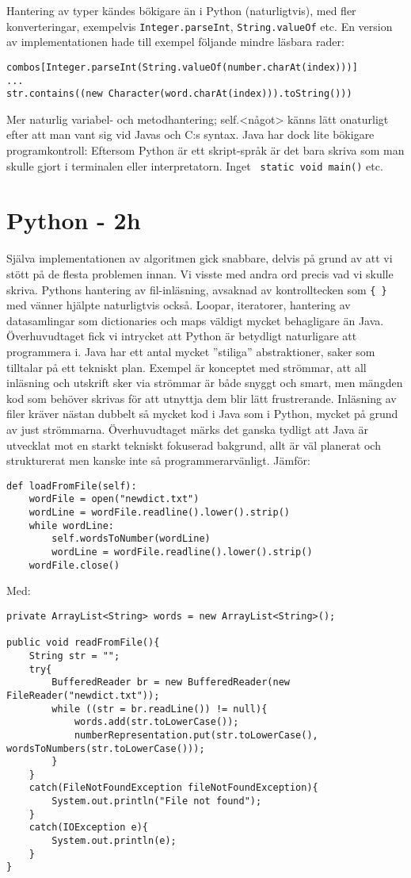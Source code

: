 \documentclass[a4paper, twoside, 11pt]{article}
\begin{document}
Hantering av typer kändes bökigare än i Python (naturligtvis), med fler konverteringar, exempelvis \verb|Integer.parseInt|, \verb|String.valueOf| etc. En version av implementationen hade till exempel följande mindre läsbara rader:\\
\begin{verbatim}
combos[Integer.parseInt(String.valueOf(number.charAt(index)))]
...
str.contains((new Character(word.charAt(index))).toString()))
\end{verbatim}

Mer naturlig variabel- och metodhantering; self.<något> känns lätt onaturligt efter att man vant sig vid Javas och C:s syntax. Java har dock lite bökigare programkontroll: Eftersom Python är ett skript-språk är det bara skriva som man skulle gjort i terminalen eller interpretatorn. Inget \verb| static void main()| etc.

\section{Python - 2h}

Själva implementationen av algoritmen gick snabbare, delvis på grund av att vi stött på de flesta problemen innan. Vi visste med andra ord precis vad vi skulle skriva. Pythons hantering av fil-inläsning, avsaknad av kontrolltecken som \verb|{ }| med vänner hjälpte naturligtvis också. Loopar, iteratorer, hantering av datasamlingar som dictionaries och maps väldigt mycket behagligare än Java. Överhuvudtaget fick vi intrycket att Python är betydligt naturligare att programmera i. Java har ett antal mycket ''stiliga'' abstraktioner, saker som tilltalar på ett tekniskt plan. Exempel är konceptet med strömmar, att all inläsning och utskrift sker via strömmar är både snyggt och smart, men mängden kod som behöver skrivas för att utnyttja dem blir lätt frustrerande. Inläsning av filer kräver nästan dubbelt så mycket kod i Java som i Python, mycket på grund av just strömmarna. Överhuvudtaget märks det ganska tydligt att Java är utvecklat mot en starkt tekniskt fokuserad bakgrund, allt är väl planerat och strukturerat men kanske inte så programmerarvänligt. Jämför:

\begin{verbatim}
def loadFromFile(self):
	wordFile = open("newdict.txt")
	wordLine = wordFile.readline().lower().strip()
	while wordLine:
		self.wordsToNumber(wordLine)
		wordLine = wordFile.readline().lower().strip()
	wordFile.close()
\end{verbatim}
\newpage
Med:
\begin{verbatim}
private ArrayList<String> words = new ArrayList<String>();

public void readFromFile(){
	String str = "";
	try{
		BufferedReader br = new BufferedReader(new FileReader("newdict.txt"));
		while ((str = br.readLine()) != null){
			words.add(str.toLowerCase());
			numberRepresentation.put(str.toLowerCase(), wordsToNumbers(str.toLowerCase()));
		}
	}
	catch(FileNotFoundException fileNotFoundException){
		System.out.println("File not found");
	}
	catch(IOException e){
		System.out.println(e);
	}
}
\end{verbatim}
\end{document}
